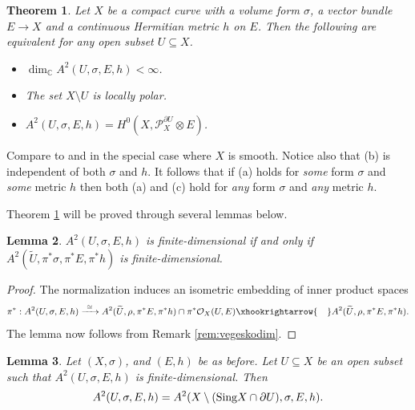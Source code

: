 \documentclass[11pt]{amsart}
\newtheorem{theorem}{Theorem}[section]
\newtheorem{lemma}[theorem]{Lemma}
\theoremstyle{definition}
\newcommand{\bC}{{\mathbb C}}
\newcommand{\ra}{\rightarrow}
\begin{document}
\begin{theorem}\label{thm:projmain}
    Let $X$ be a compact curve with a volume form $\sigma$, a vector bundle $E\ra X$ and a continuous Hermitian metric $h$ on $E$. Then the following are equivalent for any open subset $U \subseteq X$.
    \begin{itemize}
        \item[(a)] $\dim_\bC A^2(U,\sigma, E, h) < \infty$.
        \item[(b)] The set $X\setminus U$ is locally polar.
        \item[(c)] $A^2(U,\sigma, E, h) = H^0(X,\mathcal{P}_X^{\partial U} \otimes E)$.
    \end{itemize}
\end{theorem}

\noindent Compare to \cite{Sz22} and \cite{GGV22} in the special case where $X$ is smooth. Notice also that (b) is independent of both $\sigma$ and $h$. It follows that if (a) holds for \emph{some} form $\sigma$ and \emph{some} metric $h$ then both (a) and (c) hold for \emph{any} form $\sigma$ and \emph{any} metric $h$.



Theorem \ref{thm:projmain} will be proved through several lemmas below.

\begin{lemma}\label{lem:uaveges}
    $A^2(U,\sigma,E,h)$ is finite-dimensional if and only if $A^2(\widetilde{U},\pi^*\sigma,\pi^*E,\pi^*h)$
    is finite-dimensional.
\end{lemma}

\begin{proof}
    The normalization induces an isometric embedding of inner product spaces
    $$\pi^* : A^2(U,\sigma,E,h) \xrightarrow{ \ \cong \ } A^2(\widetilde{U},\rho, \pi^*E,\pi^*h) \cap \pi^*\mathcal{O}_X(U,E) \xhookrightarrow{ \ \ \ } A^2(\widetilde{U},\rho, \pi^*E,\pi^*h).$$
    The lemma now follows from Remark \ref{rem:vegeskodim}.
\end{proof}

\begin{lemma}\label{lem:singext}
    Let $(X,\sigma)$, and $(E,h) $ be as before. Let $U \subseteq X$ be an open subset such that $A^2(U,\sigma,E,h)$ is finite-dimensional. Then
        $$A^2(U,\sigma,E,h) = A^2(X \setminus (\text{\normalfont Sing}X\cap \partial U),\sigma,E,h).$$
\end{lemma}
\end{document}
